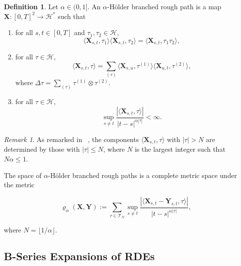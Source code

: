 \documentclass{article} %
\theoremstyle{definition}
\newtheorem{definition}{Definition}[section]
\theoremstyle{remark}
\newtheorem*{remark}{Remark}
\begin{document}
\begin{definition}
    Let $\alpha \in (0,1]$. An $\alpha$-H\"older branched rough path is a map $\mathbf{X} : [0,T]^2 \to \mathcal{H}^*$ such that
    \begin{enumerate}
        \item for all $s,t \in [0,T]$ and $\tau_1, \tau_2 \in \mathcal{H}$,
        \begin{equation*}
            \langle \mathbf{X}_{s,t}, \tau_1 \rangle \langle \mathbf{X}_{s,t}, \tau_2 \rangle = \langle \mathbf{X}_{s,t}, \tau_1 \tau_2 \rangle,
        \end{equation*}
        \item for all $\tau \in \mathcal{H}$,
        \begin{equation*}
            \langle \mathbf{X}_{s,t}, \tau \rangle = \sum_{(\tau)} \langle \mathbf{X}_{s,u}, \tau^{(1)} \rangle \langle \mathbf{X}_{u, t}, \tau^{(2)} \rangle,
        \end{equation*}
        where $\Delta \tau = \sum_{(\tau)} \tau^{(1)} \otimes \tau^{(2)}$.
        \item for all $\tau \in \mathcal{H}$,
        \begin{equation*}
            \sup_{s \neq t} \frac{|\langle \mathbf{X}_{s,t}, \tau \rangle |}{|t - s| ^{\alpha |\tau|}} < \infty.
        \end{equation*}
    \end{enumerate}
\end{definition}

\begin{remark}
    As remarked in ~\citep{hairer2015geometric,gubinelli2010ramification}, the components $\langle \mathbf{X}_{s,t}, \tau \rangle$ with $|\tau| > N$ are determined by those with $|\tau| \leq N$, where $N$ is the largest integer such that $N \alpha \leq 1$.
\end{remark}

The space of $\alpha$-H\"older branched rough paths is a complete metric space under the metric

\begin{equation*}
    \varrho_\alpha(\mathbf{X}, \mathbf{Y}) := \sum_{\tau \in \mathcal{T}_N} \sup_{s \neq t} \frac{|\langle \mathbf{X}_{s,t} - \mathbf{Y}_{s,t}, \tau \rangle |}{|t - s|^{\alpha |\tau|}},
\end{equation*}

where $N = \lfloor 1 / \alpha \rfloor$.

\subsection{B-Series Expansions of RDEs}
\end{document}
